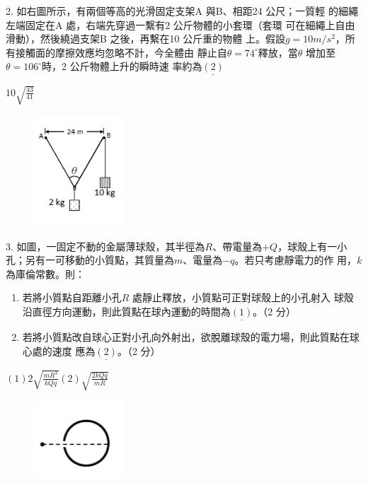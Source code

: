 \documentclass[cn,10pt,math=newtx,chinesefont=founder,device=ig]{elegantbook}
\begin{document}
\begin{example}
   2. 如右圖所示，有兩個等高的光滑固定支架A 與B、相距24 公尺；一質輕
的細繩左端固定在A 處，右端先穿過一繫有2 公斤物體的小套環（套環
可在細繩上自由滑動），然後繞過支架B 之後，再繫在10 公斤重的物體
上。假設$g = 10 m/s^2$，所有接觸面的摩擦效應均忽略不計，今全體由
靜止自$\theta = 74^\circ$釋放，當$\theta$ 增加至$\theta = 106^\circ$時，2 公斤物體上升的瞬時速
率約為$\underline{(2)}$
    \rightline{[全國聯招教甄109]}
\end{example}
\begin{solution}
    $10\sqrt{\frac{43}{41}}$
\end{solution}
\begin{figure}[htbp]
    \flushright
    \includegraphics[width=0.3\textwidth]{image/109全國22.png}
  \end{figure}
\newpage

\begin{example}
   3. 如圖，一固定不動的金屬薄球殼，其半徑為$R$、帶電量為$+Q$，球殼上有一小
孔；另有一可移動的小質點，其質量為$m$、電量為$-q$。若只考慮靜電力的作
用，$k$ 為庫倫常數。則：
\begin{enumerate}[label=(\arabic*)] 
  \item 若將小質點自距離小孔$R$ 處靜止釋放，小質點可正對球殼上的小孔射入
球殼沿直徑方向運動，則此質點在球內運動的時間為$\underline{(1)}$。（2 分）
  \item 若將小質點改自球心正對小孔向外射出，欲脫離球殼的電力場，則此質點在球心處的速度
應為$\underline{(2)}$。（2 分）
    \end{enumerate}
    \rightline{[全國聯招教甄109]}
\end{example}
\begin{solution}
    $(1) 2\sqrt{\frac{mR^3}{kQq}}  (2) \sqrt{\frac{2kQq}{mR}}$
\end{solution}
\begin{figure}[htbp]
    \flushright
    \includegraphics[width=0.3\textwidth]{image/109全國23.png}
  \end{figure}
\newpage
\end{document}
